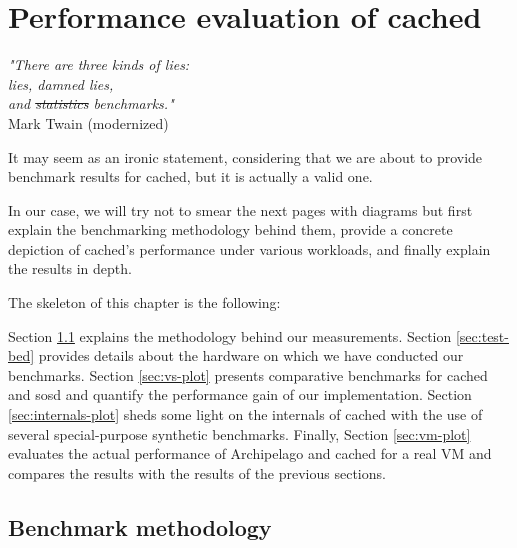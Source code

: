 \chapter{Performance evaluation of cached}\label{ch:cached-evaluation}

\begin{flushright}
	\textit{"There are three kinds of lies:\\
		lies, damned lies, \\
		and \sout{statistics} benchmarks."}	\\

	Mark Twain (modernized)
\end{flushright}

It may seem as an ironic statement, considering that we are about to provide 
benchmark results for cached, but it is actually a valid one.
\begin{comment}
What Mr.  Twain tries to say here
\footnote{
	and that's a phrase usually not heard in programming contexts...
}
is that the presentation of partials facts for something can be used to 
fabricate a plausible truth for it.
In science's case, it so often happens that promising results for an experiment 
can seem more important to the researcher's eye than negative ones due to 
positive reinforcement.
\end{comment}
In our case, we will try not to smear the next pages with diagrams but first 
explain the benchmarking methodology behind them, provide a concrete depiction 
of cached's performance under various workloads, and finally explain the 
results in depth.

The skeleton of this chapter is the following:

Section \ref{sec:perf-meth} explains the methodology behind our measurements.  
Section \ref{sec:test-bed} provides details about the hardware on which we have 
conducted our benchmarks.  Section \ref{sec:vs-plot} presents comparative 
benchmarks for cached and sosd and quantify the performance gain of our 
implementation. Section \ref{sec:internals-plot} sheds some light on the 
internals of cached with the use of several special-purpose synthetic 
benchmarks.  Finally, Section \ref{sec:vm-plot} evaluates the actual 
performance of Archipelago and cached for a real VM and compares the results 
with the results of the previous sections.

\section{Benchmark methodology}\label{sec:perf-meth}

